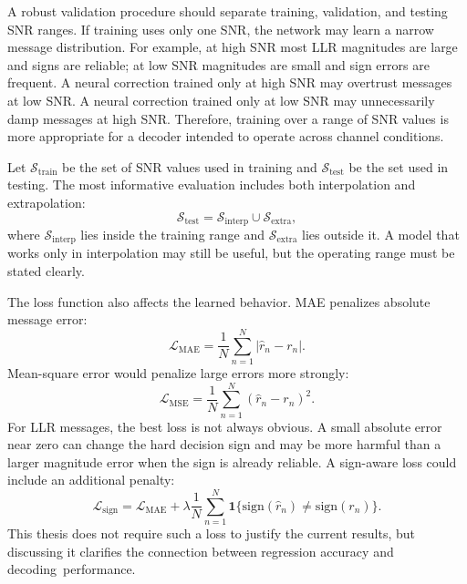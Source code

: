 A robust validation procedure should separate training, validation, and testing SNR ranges. If training uses only one SNR, the network may learn a narrow message distribution. For example, at high SNR most LLR magnitudes are large and signs are reliable; at low SNR magnitudes are small and sign errors are frequent. A neural correction trained only at high SNR may overtrust messages at low SNR. A neural correction trained only at low SNR may unnecessarily damp messages at high SNR. Therefore, training over a range of SNR values is more appropriate for a decoder intended to operate across channel conditions.

Let $\mathcal{S}_{\mathrm{train}}$ be the set of SNR values used in training and $\mathcal{S}_{\mathrm{test}}$ be the set used in testing. The most informative evaluation includes both interpolation and extrapolation:
\begin{equation}
  \mathcal{S}_{\mathrm{test}}
  =
  \mathcal{S}_{\mathrm{interp}}\cup\mathcal{S}_{\mathrm{extra}},
\end{equation}
where $\mathcal{S}_{\mathrm{interp}}$ lies inside the training range and $\mathcal{S}_{\mathrm{extra}}$ lies outside it. A model that works only in interpolation may still be useful, but the operating range must be stated clearly.

The loss function also affects the learned behavior. MAE penalizes absolute message error:
\begin{equation}
  \mathcal{L}_{\mathrm{MAE}}=\frac{1}{N}\sum_{n=1}^{N}|\hat{r}_n-r_n|.
\end{equation}
Mean-square error would penalize large errors more strongly:
\begin{equation}
  \mathcal{L}_{\mathrm{MSE}}=\frac{1}{N}\sum_{n=1}^{N}(\hat{r}_n-r_n)^2.
\end{equation}
For LLR messages, the best loss is not always obvious. A small absolute error near zero can change the hard decision sign and may be more harmful than a larger magnitude error when the sign is already reliable. A sign-aware loss could include an additional penalty:
\begin{equation}
  \mathcal{L}_{\mathrm{sign}}
  =
  \mathcal{L}_{\mathrm{MAE}}
  +
  \lambda
  \frac{1}{N}\sum_{n=1}^{N}
  \mathbf{1}\{\mathrm{sign}(\hat{r}_n)\ne\mathrm{sign}(r_n)\}.
\end{equation}
This thesis does not require such a loss to justify the current results, but discussing it clarifies the connection between regression accuracy and decoding~performance.

